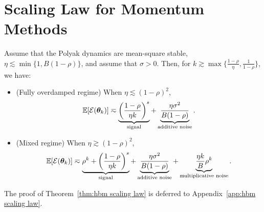 \documentclass[11pt]{article}
\begin{document}
\section{Scaling Law for Momentum Methods}
\label{sec:scaling law}

\begin{theorem}
\label{thm:hbm scaling law}
Assume that the Polyak dynamics are mean-square stable, $\eta\lesssim\min\{1,B(1-\rho)\}$, and assume that \(\sigma>0\). Then, for $k\gtrsim\max\{\frac{1-\rho}{\eta},\frac{1}{1-\rho}\}$, we have:
\begin{itemize}
\item (Fully overdamped regime) When \(\eta\lesssim(1-\rho)^2\),
\begin{equation}
\label{eq:hb-loss-overdamped}
\mathbb{E}[\mathcal{E}(\bm{\theta}_k)]
\eqsim
\underbrace{
\left(\frac{1-\rho}{\eta k}\right)^s
}_{\text{signal}}
+
\underbrace{
\frac{\eta\sigma^2}{B(1-\rho)}
}_{\text{additive noise}}.
\end{equation}
\vspace{-1em}
\item (Mixed regime) When \(\eta\gtrsim(1-\rho)^2\),
\begin{equation}
\label{eq:hb-loss-mixed}
\EE[\cE(\btheta_k)]
\eqsim
\underbrace{\rho^k+\left(\frac{1-\rho}{\eta k}\right)^s}_{\text{signal}}
+
\underbrace{\frac{\eta\sigma^2}{B(1-\rho)}}_{\text{additive noise}}
+
\underbrace{\frac{\eta k}{B}\rho^k}_{\text{multiplicative noise}}.
\vspace{-0.5em}
\end{equation}
\end{itemize}
\end{theorem}
The proof of Theorem~\ref{thm:hbm scaling law} is deferred to Appendix~\ref{app:hbm scaling law}.
\end{document}
